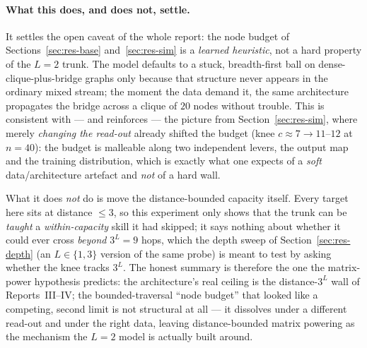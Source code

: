 \documentclass[11pt,a4paper]{article}
\begin{document}
\paragraph{What this does, and does not, settle.} It settles the open caveat of the whole report:
the node budget of Sections~\ref{sec:res-base} and~\ref{sec:res-sim} is a \emph{learned heuristic},
not a hard property of the $L=2$ trunk. The model defaults to a stuck, breadth-first ball on
dense-clique-plus-bridge graphs only because that structure never appears in the ordinary mixed
stream; the moment the data demand it, the same architecture propagates the bridge across a clique of
$20$ nodes without trouble. This is consistent with --- and reinforces --- the picture from
Section~\ref{sec:res-sim}, where merely \emph{changing the read-out} already shifted the budget
(knee $c\approx7\to11$--$12$ at $n=40$): the budget is malleable along two independent levers,
the output map and the training distribution, which is exactly what one expects of a \emph{soft}
data/architecture artefact and \emph{not} of a hard wall.

What it does \emph{not} do is move the distance-bounded capacity itself. Every target here sits at
distance $\le 3$, so this experiment only shows that the trunk can be \emph{taught} a
\emph{within-capacity} skill it had skipped; it says nothing about whether it could ever cross
\emph{beyond} $3^L=9$ hops, which the depth sweep of Section~\ref{sec:res-depth} (an $L\in\{1,3\}$
version of the same probe) is meant to test by asking whether the knee tracks $3^L$.
The honest summary is therefore the one the matrix-power hypothesis predicts: the architecture's real
ceiling is the distance-$3^L$ wall of Reports~III--IV; the bounded-traversal ``node budget'' that
looked like a competing, second limit is not structural at all --- it dissolves under a different
read-out and under the right data, leaving distance-bounded matrix powering as the mechanism the
$L=2$ model is actually built around.
\end{document}
